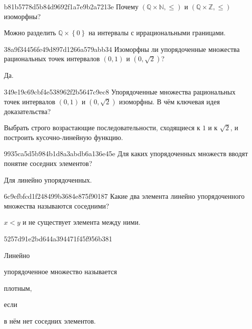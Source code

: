 \begin{note}{b81b5778d5b84d9692f1a7e9b2a7213e}
    Почему \({ (\mathbb Q \times \mathbb N, \leqslant) }\) и \({ (\mathbb Q \times \mathbb Z, \leqslant) }\) изоморфны?

    \begin{cloze}{1}
        Можно разделить \({ \mathbb Q \times \left\{ 0 \right\} }\) на интервалы с иррациональными границами.
    \end{cloze}
\end{note}

\begin{note}{38a9f34456fe49d897d1266a579abb34}
    Изоморфны ли упорядоченные множества рациональных точек интервалов \({ (0, 1) }\) и \({ (0, \sqrt{2}) }\)?

    \begin{cloze}{1}
        Да.
    \end{cloze}
\end{note}

\begin{note}{349e19c69cbf4e538962f2b5647c9ec8}
    Упорядоченные множества рациональных точек интервалов \({ (0, 1) }\) и \({ (0, \sqrt{2}) }\) изоморфны.
    В чём ключевая идея доказательства?

    \begin{cloze}{1}
        Выбрать строго возрастающие последовательности, сходящиеся к \({ 1 }\) и к \({ \sqrt{2} }\), и построить кусочно-линейную функцию.
    \end{cloze}
\end{note}

\begin{note}{9935ca5d5b984b1d8a3abdb6a136e45e}
    Для каких упорядоченных множеств вводят понятие соседних элементов?

    \begin{cloze}{1}
        Для линейно упорядоченных.
    \end{cloze}
\end{note}

\begin{note}{6c9efbfcd1f248499b3684e875f90187}
    Какие два элемента линейно упорядоченного множества называются соседними?

    \begin{cloze}{1}
        \({ x < y }\) и не существует элемента между ними.
    \end{cloze}
\end{note}

\begin{note}{5257d91e2bd644a394471f45f956b381}
    \begin{icloze}{3}Линейно\end{icloze} упорядоченное множество называется \begin{icloze}{2}плотным,\end{icloze} если \begin{icloze}{1}в нём нет соседних элементов.\end{icloze}
\end{note}

